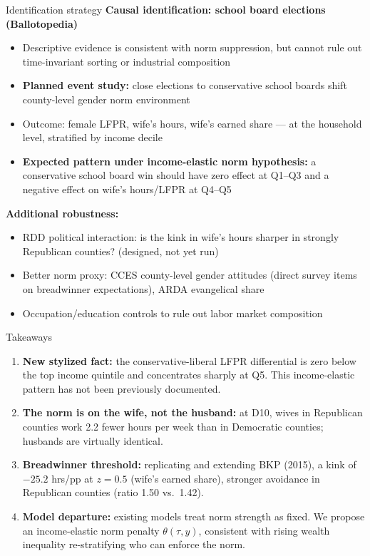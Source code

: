 \documentclass[10pt,aspectratio=169]{beamer}
\begin{document}
\begin{frame}{Identification strategy}
  \textbf{Causal identification: school board elections (Ballotopedia)}
  \begin{itemize}
    \item Descriptive evidence is consistent with norm suppression, but
          cannot rule out time-invariant sorting or industrial composition
    \item \textbf{Planned event study:} close elections to conservative school
          boards shift county-level gender norm environment
    \item Outcome: female LFPR, wife's hours, wife's earned share — at the
          household level, stratified by income decile
    \item \textbf{Expected pattern under income-elastic norm hypothesis:}
          a conservative school board win should have zero effect at Q1–Q3
          and a negative effect on wife's hours/LFPR at Q4–Q5
  \end{itemize}
  \medskip
  \textbf{Additional robustness:}
  \begin{itemize}
    \item RDD political interaction: is the kink in wife's hours sharper
          in strongly Republican counties? (designed, not yet run)
    \item Better norm proxy: CCES county-level gender attitudes (direct survey
          items on breadwinner expectations), ARDA evangelical share
    \item Occupation/education controls to rule out labor market composition
  \end{itemize}
\end{frame}

\begin{frame}{Takeaways}
  \begin{enumerate}
    \item \textbf{New stylized fact:} the conservative-liberal LFPR differential
          is zero below the top income quintile and concentrates sharply at Q5.
          This income-elastic pattern has not been previously documented.
    \smallskip
    \item \textbf{The norm is on the wife, not the husband:} at D10, wives in
          Republican counties work 2.2 fewer hours per week than in Democratic
          counties; husbands are virtually identical.
    \smallskip
    \item \textbf{Breadwinner threshold:} replicating and extending BKP (2015),
          a kink of $-25.2$ hrs/pp at $z=0.5$ (wife's earned share), stronger
          avoidance in Republican counties (ratio 1.50 vs.\ 1.42).
    \smallskip
    \item \textbf{Model departure:} existing models treat norm strength as fixed.
          We propose an income-elastic norm penalty $\theta(\tau, y)$, consistent
          with rising wealth inequality re-stratifying who can enforce the norm.
  \end{enumerate}
\end{frame}
\end{document}
